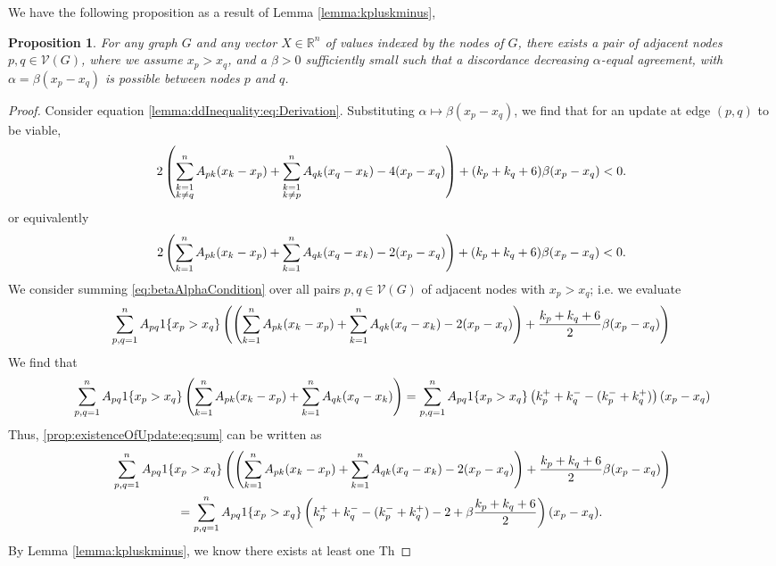\documentclass{article}
\newtheorem{proposition}{Proposition}
\theoremstyle{remark}
\newcommand{\R}[0]{\mathbb{R}}
\begin{document}
We have the following proposition as a result of Lemma \ref{lemma:kpluskminus},
\begin{proposition}{\label{prop:existenceOfUpdate}}
	For any graph $G$ and any vector $X\in\R^n$ of values indexed by the nodes of $G$, there exists a pair of adjacent nodes $p,q\in\mathcal{V}(G)$, where we assume $x_p>x_q$, and a $\beta>0$ sufficiently small such that a discordance decreasing $\alpha$-equal agreement, with $\alpha=\beta(x_p-x_q)$ is possible between nodes $p$ and $q$.
\end{proposition}
\begin{proof}
Consider equation \eqref{lemma:ddInequality:eq:Derivation}.  Substituting $\alpha\mapsto\beta(x_p-x_q)$, we find that for an update at edge $(p,q)$ to be viable,
\begin{equation}{\label{eq:betaAlphaCondition}}
	2\left(\sum_{\substack{k=1\\k\neq q}}^nA_{pk}(x_k-x_p) + \sum_{\substack{k=1\\k\neq p}}^nA_{qk}(x_q-x_k) - 4(x_p-x_q)\right) + (k_p+k_q+6)\beta(x_p-x_q) < 0.
\end{equation}
or equivalently
\begin{equation}{\label{eq:betaAlphaCondition2}}
	2\left(\sum_{k=1}^nA_{pk}(x_k-x_p) + \sum_{k=1}^nA_{qk}(x_q-x_k) - 2(x_p-x_q)\right) + (k_p+k_q+6)\beta(x_p-x_q) < 0.
\end{equation}
We consider summing \eqref{eq:betaAlphaCondition} over all pairs $p,q\in\mathcal{V}(G)$ of adjacent nodes with $x_p>x_q$; i.e. we evaluate
\begin{equation}{\label{prop:existenceOfUpdate:eq:sum}}
	\begin{aligned}
		\sum_{p,q=1}^nA_{pq}1\{x_p>x_q\}\left(\left(\sum_{k=1}^nA_{pk}(x_k-x_p) + \sum_{k=1}^nA_{qk}(x_q-x_k) - 2(x_p-x_q)\right) + \frac{k_p+k_q+6}{2}\beta(x_p-x_q)\right)
	\end{aligned}
\end{equation}
We find that 
\begin{equation}{\label{prop:existenceOfUpdate:eq:sumVals}}
	\sum_{p,q=1}^nA_{pq}1\{x_p>x_q\}\left(\sum_{k=1}^nA_{pk}(x_k-x_p) + \sum_{k=1}^nA_{qk}(x_q-x_k)\right) = \sum_{p,q=1}^nA_{pq}1\{x_p>x_q\}\left(k_p^++k_q^--(k_p^-+k_q^+)\right)(x_p-x_q)
\end{equation}
Thus, \eqref{prop:existenceOfUpdate:eq:sum} can be written as
\begin{multline}{\label{prop:existenceOfUpdate:eq:sumRewrite}}
	\sum_{p,q=1}^nA_{pq}1\{x_p>x_q\}\left(\left(\sum_{k=1}^nA_{pk}(x_k-x_p) + \sum_{k=1}^nA_{qk}(x_q-x_k) - 2(x_p-x_q)\right) + \frac{k_p+k_q+6}{2}\beta(x_p-x_q)\right)\\
	= \sum_{p,q=1}^nA_{pq}1\{x_p>x_q\}\left(k_p^++k_q^--(k_p^-+k_q^+)-2+\beta\frac{k_p+k_q+6}{2}\right)(x_p-x_q).
\end{multline}
By Lemma \ref{lemma:kpluskminus}, we know there exists at least one Th
\end{proof}
\end{document}

